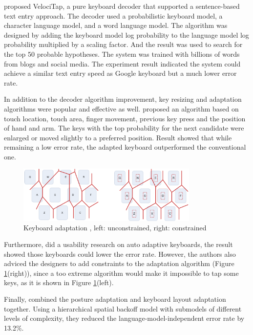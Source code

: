 \documentclass[11pt]{article}
\begin{document}
\citet{10.1145/2702123.2702135} proposed VelociTap, a pure keyboard decoder that supported a sentence-based text entry approach. The decoder used a probabilistic keyboard model, a character language model, and a word language model. The algorithm was designed by adding the keyboard model log probability to the language model log probability multiplied by a scaling factor. And the result was used to search for the top 50 probable hypotheses. The system was trained with billions of words from blogs and social media. The experiment result indicated the system could achieve a similar text entry speed as Google keyboard but a much lower error rate.

In addition to the decoder algorithm improvement, key resizing and adaptation algorithms were popular and effective as well. \citet{10.1145/2207676.2208520} proposed an algorithm based on touch location, touch area, finger movement, previous key press and the position of hand and arm. The keys with the top probability for the next candidate were enlarged or moved slightly to a preferred position. Result showed that while remaining a low error rate, the adapted keyboard outperformed the conventional one. 

\begin{figure}[H]
  \centering
  \includegraphics[width=0.8\textwidth]{Usability.png}
  \caption{Keyboard adaptation \citep{10.1145/1719970.1719986}, left: unconstrained, right: constrained}
  \label{fig:usability}
\end{figure}

Furthermore, \citet{10.1145/1719970.1719986} did a usability research on auto adaptive keyboards, the result showed those keyboards could lower the error rate. However, the authors also adviced the designers to add constraints to the adaptation algorithm (Figure \ref{fig:usability}(right)), since a too extreme algorithm would make it impossible to tap some keys, as it is shown in Figure \ref{fig:usability}(left).

Finally, \citet{10.1145/2470654.2481384} combined the posture adaptation and keyboard layout adaptation together. Using a hierarchical spatial backoff model with submodels of different levels of complexity, they reduced the language-model-independent error rate by 13.2\%.
\end{document}
